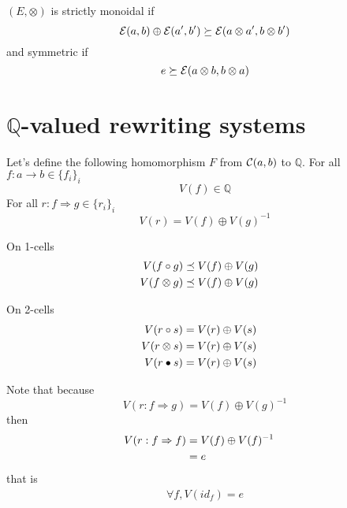 \documentclass[a4paper]{article}
\begin{document}
\begin{definition}
$(E, \otimes)$ is strictly monoidal if
\[
{\cal E}(a, b) \oplus {\cal E}(a', b') \succeq {\cal E}(a \otimes a', b \otimes b')
\]
and symmetric if
\[
e \succeq {\cal E}(a \otimes b, b \otimes a)
\]
\end{definition}



\section{$\mathbb{Q}$-valued rewriting systems}

\begin{definition}
Let's define the following homomorphism $F$ from ${\cal C}(a, b)$ to $\mathbb{Q}$. For all $f: a \to b \in \{f_i\}_i$
\[
V(f) \in \mathbb{Q}
\]
For all $r: f \Rightarrow g \in \{r_i\}_i$
\[
V(r) = V(f) \oplus V(g)^{-1}
\]

On 1-cells
\begin{align}
V(f \circ g) &\preceq V(f) \oplus V(g) \cr
V(f \otimes g) &\preceq V(f) \oplus V(g)
\end{align}

On 2-cells
\begin{align}
V(r \circ s) &= V(r) \oplus V(s) \cr
V(r \otimes s) &= V(r) \oplus V(s) \cr
V(r \bullet s) &= V(r) \oplus V(s)
\end{align}
\end{definition}

\begin{remark}
Note that because
\[
V(r: f \Rightarrow g) = V(f) \oplus V(g)^{-1}
\]
then
\begin{align}
V(r: f \Rightarrow f) &= V(f) \oplus V(f)^{-1} \cr
&= e
\end{align}
that is
\begin{align}
\forall f, V(id_f) = e
\end{align}
\end{remark}
\end{document}
